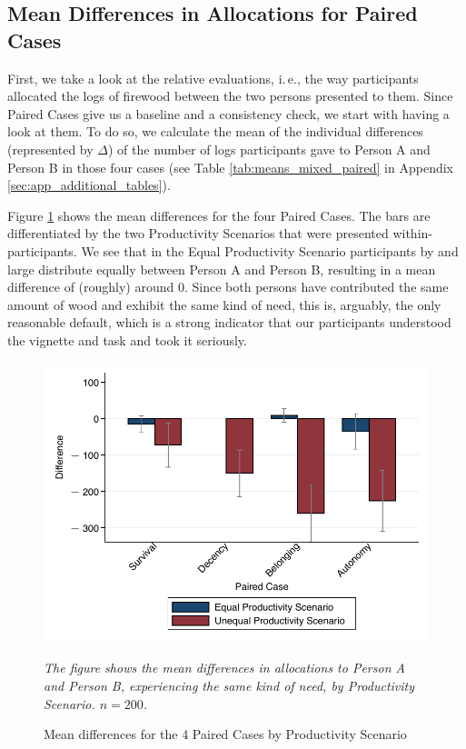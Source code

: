 \documentclass[egregdoesnotlikesansseriftitles]{scrartcl}
\begin{document}
\subsection{Mean Differences in Allocations for Paired Cases}\label{sec:results_mean_paired}
First, we take a look at the relative evaluations, i.\,e., the way participants allocated the logs of firewood between the two persons presented to them.
Since Paired Cases give us a baseline and a consistency check, we start with having a look at them.
To do so, we calculate the mean of the individual differences (represented by $\Delta$) of the number of logs participants gave to Person A and Person B in those four cases (see Table \ref{tab:means_mixed_paired} in Appendix \ref{sec:app_additional_tables}).

Figure \ref{fig:overview_paired} shows the mean differences for the four Paired Cases.
The bars are differentiated by the two Productivity Scenarios that were presented within-participants.
We see that in the Equal Productivity Scenario participants by and large distribute equally between Person A and Person B, resulting in a mean difference of (roughly) around $0$.
Since both persons have contributed the same amount of wood and exhibit the same kind of need, this is, arguably, the only reasonable default, which is a strong indicator that our participants understood the vignette and task and took it seriously.

\begin{figure}[t]
   \centering
   \includegraphics[width=.75\textwidth]{figures/figure_4.pdf}
   \begin{minipage}{0.75\linewidth}
   \footnotesize
   \emph{The figure shows the mean differences in allocations to Person A and Person B, experiencing the same kind of need, by Productivity Scenario. $n = 200$.}
   \end{minipage}
   \caption{Mean differences for the 4 Paired Cases by Productivity Scenario}
   \label{fig:overview_paired}
\end{figure}
\end{document}
